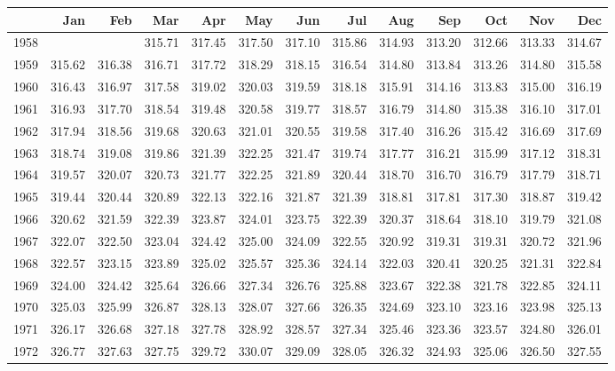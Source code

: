 \documentclass[11pt, a4paper]{article} %
\begin{document}
\begin{table}[ht]
\centering
{\tiny
\begin{tabular}{rrrrrrrrrrrrr}
  \hline
 & Jan & Feb & Mar & Apr & May & Jun & Jul & Aug & Sep & Oct & Nov & Dec \\ 
  \hline
1958 &  &  & 315.71 & 317.45 & 317.50 & 317.10 & 315.86 & 314.93 & 313.20 & 312.66 & 313.33 & 314.67 \\ 
  1959 & 315.62 & 316.38 & 316.71 & 317.72 & 318.29 & 318.15 & 316.54 & 314.80 & 313.84 & 313.26 & 314.80 & 315.58 \\ 
  1960 & 316.43 & 316.97 & 317.58 & 319.02 & 320.03 & 319.59 & 318.18 & 315.91 & 314.16 & 313.83 & 315.00 & 316.19 \\ 
  1961 & 316.93 & 317.70 & 318.54 & 319.48 & 320.58 & 319.77 & 318.57 & 316.79 & 314.80 & 315.38 & 316.10 & 317.01 \\ 
  1962 & 317.94 & 318.56 & 319.68 & 320.63 & 321.01 & 320.55 & 319.58 & 317.40 & 316.26 & 315.42 & 316.69 & 317.69 \\ 
  1963 & 318.74 & 319.08 & 319.86 & 321.39 & 322.25 & 321.47 & 319.74 & 317.77 & 316.21 & 315.99 & 317.12 & 318.31 \\ 
  1964 & 319.57 & 320.07 & 320.73 & 321.77 & 322.25 & 321.89 & 320.44 & 318.70 & 316.70 & 316.79 & 317.79 & 318.71 \\ 
  1965 & 319.44 & 320.44 & 320.89 & 322.13 & 322.16 & 321.87 & 321.39 & 318.81 & 317.81 & 317.30 & 318.87 & 319.42 \\ 
  1966 & 320.62 & 321.59 & 322.39 & 323.87 & 324.01 & 323.75 & 322.39 & 320.37 & 318.64 & 318.10 & 319.79 & 321.08 \\ 
  1967 & 322.07 & 322.50 & 323.04 & 324.42 & 325.00 & 324.09 & 322.55 & 320.92 & 319.31 & 319.31 & 320.72 & 321.96 \\ 
  1968 & 322.57 & 323.15 & 323.89 & 325.02 & 325.57 & 325.36 & 324.14 & 322.03 & 320.41 & 320.25 & 321.31 & 322.84 \\ 
  1969 & 324.00 & 324.42 & 325.64 & 326.66 & 327.34 & 326.76 & 325.88 & 323.67 & 322.38 & 321.78 & 322.85 & 324.11 \\ 
  1970 & 325.03 & 325.99 & 326.87 & 328.13 & 328.07 & 327.66 & 326.35 & 324.69 & 323.10 & 323.16 & 323.98 & 325.13 \\ 
  1971 & 326.17 & 326.68 & 327.18 & 327.78 & 328.92 & 328.57 & 327.34 & 325.46 & 323.36 & 323.57 & 324.80 & 326.01 \\ 
  1972 & 326.77 & 327.63 & 327.75 & 329.72 & 330.07 & 329.09 & 328.05 & 326.32 & 324.93 & 325.06 & 326.50 & 327.55 \\ 

\end{tabular}}
\end{table}
\end{document}
